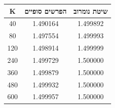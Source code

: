 \begin{tabular}{|c|c|c|}
\hline
K & הפרשים סופיים & שיטת נומרוב \\
\hline
40 & 1.490164 & 1.499892 \\
\hline
80 & 1.497554 & 1.499993 \\
\hline
120 & 1.498914 & 1.499999 \\
\hline
240 & 1.499729 & 1.500000 \\
\hline
360 & 1.499879 & 1.500000 \\
\hline
480 & 1.499932 & 1.500000 \\
\hline
600 & 1.499957 & 1.500000 \\
\hline
\end{tabular}
